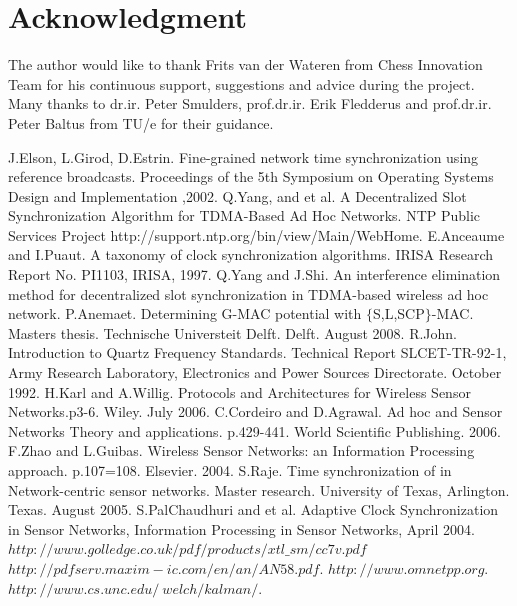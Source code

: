 \documentclass[journal]{IEEEtran}
\begin{document}
\section{\textbf{Acknowledgment}}\noindent The author would like to thank Frits van der Wateren from Chess Innovation Team for his continuous support, suggestions and advice during the project. Many thanks to dr.ir. Peter Smulders, prof.dr.ir. Erik Fledderus and prof.dr.ir. Peter Baltus from TU/e for their guidance.
\begin{thebibliography}{\textbf{References}}
J.Elson, L.Girod, D.Estrin. Fine-grained network time synchronization using reference broadcasts. Proceedings of the 5th Symposium on Operating Systems Design and Implementation ,2002.
Q.Yang, and et al. A Decentralized Slot Synchronization Algorithm for TDMA-Based Ad Hoc Networks.
NTP Public Services Project http://support.ntp.org/bin/view/Main/WebHome.
E.Anceaume and I.Puaut. A taxonomy of clock synchronization algorithms. IRISA Research Report No. PI1103, IRISA, 1997.
Q.Yang and J.Shi. An interference elimination method for decentralized slot synchronization in TDMA-based wireless ad hoc network.
 P.Anemaet. Determining G-MAC potential with $\{$S,L,SCP$\}$-MAC. Masters thesis. Technische Universteit Delft. Delft. August 2008.
R.John. Introduction to Quartz Frequency Standards. Technical Report SLCET-TR-92-1, Army Research Laboratory,
Electronics and Power Sources Directorate. October 1992.
H.Karl and A.Willig. Protocols and Architectures for Wireless Sensor Networks.p3-6. Wiley. July 2006.
C.Cordeiro and D.Agrawal. Ad hoc and Sensor Networks Theory and applications. p.429-441. World Scientific Publishing. 2006.
F.Zhao and  L.Guibas. Wireless Sensor Networks: an Information Processing approach. p.107=108. Elsevier. 2004.
 S.Raje. Time synchronization of in Network-centric sensor networks. Master research. University of Texas, Arlington. Texas. August 2005.
S.PalChaudhuri and et al. Adaptive Clock Synchronization in Sensor Networks, Information Processing in Sensor Networks, April 2004.
 $http://www.golledge.co.uk/pdf/products/xtl\_sm/cc7v.pdf$
 $http://pdfserv.maxim-ic.com/en/an/AN58.pdf$.
$http://www.omnetpp.org$.
$http://www.cs.unc.edu/~welch/kalman/$.
\end{thebibliography}
\end{document}
